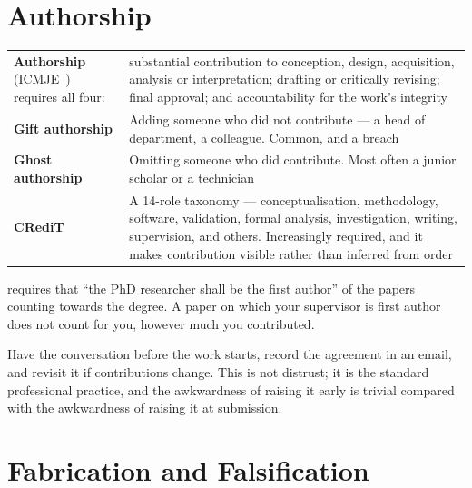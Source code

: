 \section{Authorship}

\begin{center}
\small
\begin{tabular}{@{}L{3.6cm}L{10.7cm}@{}}
\toprule
\textbf{Authorship} (ICMJE~\cite{icmje2024recommendations}) requires all four:
  & substantial contribution to conception, design, acquisition, analysis or
    interpretation; drafting or critically revising; final approval; and
    accountability for the work's integrity \\
\textbf{Gift authorship}
  & Adding someone who did not contribute --- a head of department, a
    colleague. Common, and a breach \\
\textbf{Ghost authorship}
  & Omitting someone who did contribute. Most often a junior scholar or a
    technician \\
\textbf{CRediT}~\cite{brand2015beyond}
  & A 14-role taxonomy --- conceptualisation, methodology, software,
    validation, formal analysis, investigation, writing, supervision, and
    others. Increasingly required, and it makes contribution visible rather
    than inferred from order \\
\bottomrule
\end{tabular}
\end{center}

\begin{alertbox}
 requires that ``the PhD researcher shall be the
first author'' of the papers counting towards the degree. A paper on which your
supervisor is first author does not count for you, however much you
contributed.

\medskip
Have the conversation before the work starts, record the agreement in an email,
and revisit it if contributions change. This is not distrust; it is the
standard professional practice, and the awkwardness of raising it early is
trivial compared with the awkwardness of raising it at submission.
\end{alertbox}

\section{Fabrication and Falsification}

